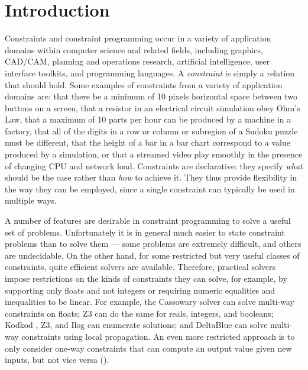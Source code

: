 \section{Introduction}
\label{sec:introduction}
Constraints and constraint programming occur in a variety of
application domains within computer science and related fields,
including graphics, CAD/CAM, planning and operations research,
artificial intelligence, user interface toolkits, and programming
languages. A \emph{constraint} is simply a relation that
should hold.  Some examples of constraints from a variety of
application domains are: that there be a minimum of 10 pixels
horizontal space between two buttons on a screen, that a resistor in
an electrical circuit simulation obey Ohm's Law, that a maximum of 10
parts per hour can be produced by a machine in a factory, that all of
the digits in a row or column or subregion of a Sudoku puzzle must be
different, that the height of a bar in a bar chart correspond to a
value produced by a simulation,
or that a streamed video play smoothly in the presence of
changing CPU and network load.  Constraints are declarative: they
specify \emph{what} should be the case rather than \emph{how} to
achieve it.  They thus provide flexibility in the way they can be
employed, since a single constraint can typically be used in multiple
ways.

A number of features are desirable in constraint programming to solve
a useful set of problems.  Unfortunately it is in general much easier
to state constraint problems than to solve them --- some problems are
extremely difficult, and others are undecidable. On the other hand,
for some restricted but very useful classes of constraints, quite
efficient solvers are available.  Therefore, practical solvers impose
restrictions on the kinds of constraints they can solve, for example,
by supporting only floats and not integers or requiring numeric
equalities and inequalities to be linear.  For example, the Cassowary
solver \cite{badros-tochi-2001} can solve multi-way constraints on
floats; Z3 \cite{de2008z3} can do the same for reals, integers, and
booleans; Kodkod \cite{torlak2007kodkod}, Z3, and Ilog
\cite{puget1994c++,ilogmanual} can enumerate solutions; and DeltaBlue
\cite{freeman-benson-phoenix-1989} can solve multi-way constraints
using local propagation.  An even more restricted approach is to only
consider one-way constraints that can compute an output value given
new inputs, but not vice versa
(\eg \cite{hudson-uist-1996,myers-ieee-computer-1990}).

